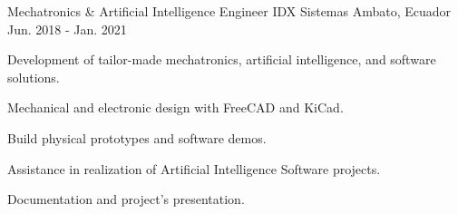 \begin{cventries}
  \cventry
    {Mechatronics \& Artificial Intelligence Engineer} %
    {IDX Sistemas} %
    {Ambato, Ecuador} %
    {Jun. 2018 - Jan. 2021} %
    {
      \begin{cvitems} %
        \item {Development of tailor-made mechatronics, artificial intelligence, and software solutions.}
        \item {Mechanical and electronic design with FreeCAD and KiCad.}
        \item {Build physical prototypes and software demos.}
        \item {Assistance in realization of Artificial Intelligence Software projects.}
        \item {Documentation and project’s presentation.}
      \end{cvitems}
    }

\end{cventries}

